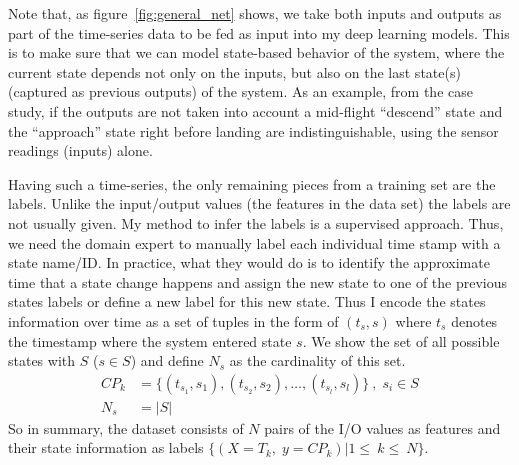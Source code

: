 Note that, as figure~\ref{fig:general_net} shows, we take both inputs and outputs as part of the time-series data to be fed as input into my deep learning models. 
This is to make sure that we can model state-based behavior of the system, where the current state depends not only on the inputs, but also on the last state(s) (captured as previous outputs) of the system. As an example, from the case study, if the outputs are not taken into account 
a mid-flight ``descend'' state and the ``approach'' state right before landing
are indistinguishable, using the sensor readings (inputs) alone. 

Having such a time-series, the only remaining pieces from a training set are the labels. Unlike the input/output values (the features in the data set) the labels are not usually given. My method to infer the labels is a supervised approach. Thus, we need the domain expert to manually label each individual time stamp with a state name/ID. In practice, what they would do is to identify the approximate time that a state change happens and assign the new state to one of the previous states labels or define a new label for this new state.
Thus I encode the states information over time as a set of tuples in the form of $(t_s, s)$ where $t_s$ denotes the timestamp where the system entered state $s$. We show the set of all possible states with $S$ ($s \in S$) and define $N_s$ as the cardinality of this set. 
\begin{equation}\label{eq:change_point}\begin{split}
    CP_k {}&{}= \big\{ (t_{s_1}, s_1), (t_{s_2}, s_2), \ldots, (t_{s_l}, s_l) \big\}\:,\; s_i \in S \\
    N_s  {}&{}= |S|
\end{split}
\end{equation}
So in summary, the dataset consists of $N$ pairs of the I/O values as features and their state information as labels $\big\{(X=T_k,\;y=CP_k)|1\leq~k\leq~N\big\}$. 

